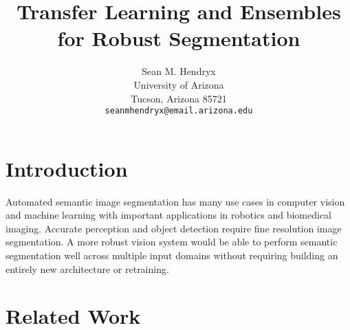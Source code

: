 \documentclass[10pt,twocolumn,letterpaper]{article}
\begin{document}
\title{Transfer Learning and Ensembles for Robust Segmentation}

\author{Sean M. Hendryx\\
University of Arizona\\
Tucson, Arizona 85721\\
{\tt\small seanmhendryx@email.arizona.edu}
}

\maketitle

\doublespacing

\begin{abstract}

\end{abstract}

\section{Introduction}

Automated semantic image segmentation has many use cases in computer vision and
machine learning with important applications in robotics and biomedical imaging.
Accurate perception and object detection require fine resolution image segmentation.
A more robust vision system would be able to perform semantic segmentation well across
multiple input domains without requiring building an entirely new architecture or retraining.


\section{Related Work}
\end{document}
